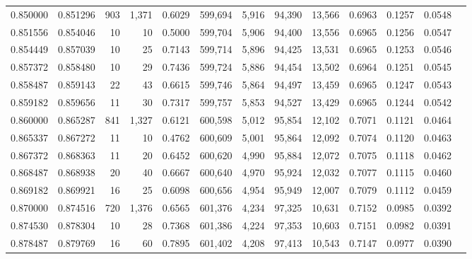 \begin{tabular}{rrrrrrrrrrrrr}
0.850000 & 0.851296 &    903 & 1,371 &                                     0.6029 & 599,694 &   5,916 &  94,390 &  13,566 & 0.6963 & 0.1257 & 0.0548 \\
0.851556 & 0.854046 &     10 &    10 &                                     0.5000 & 599,704 &   5,906 &  94,400 &  13,556 & 0.6965 & 0.1256 & 0.0547 \\
0.854449 & 0.857039 &     10 &    25 &                                     0.7143 & 599,714 &   5,896 &  94,425 &  13,531 & 0.6965 & 0.1253 & 0.0546 \\
0.857372 & 0.858480 &     10 &    29 &                                     0.7436 & 599,724 &   5,886 &  94,454 &  13,502 & 0.6964 & 0.1251 & 0.0545 \\
0.858487 & 0.859143 &     22 &    43 &                                     0.6615 & 599,746 &   5,864 &  94,497 &  13,459 & 0.6965 & 0.1247 & 0.0543 \\
0.859182 & 0.859656 &     11 &    30 &                                     0.7317 & 599,757 &   5,853 &  94,527 &  13,429 & 0.6965 & 0.1244 & 0.0542 \\
0.860000 & 0.865287 &    841 & 1,327 &                                     0.6121 & 600,598 &   5,012 &  95,854 &  12,102 & 0.7071 & 0.1121 & 0.0464 \\
0.865337 & 0.867272 &     11 &    10 &                                     0.4762 & 600,609 &   5,001 &  95,864 &  12,092 & 0.7074 & 0.1120 & 0.0463 \\
0.867372 & 0.868363 &     11 &    20 &                                     0.6452 & 600,620 &   4,990 &  95,884 &  12,072 & 0.7075 & 0.1118 & 0.0462 \\
0.868487 & 0.868938 &     20 &    40 &                                     0.6667 & 600,640 &   4,970 &  95,924 &  12,032 & 0.7077 & 0.1115 & 0.0460 \\
0.869182 & 0.869921 &     16 &    25 &                                     0.6098 & 600,656 &   4,954 &  95,949 &  12,007 & 0.7079 & 0.1112 & 0.0459 \\
0.870000 & 0.874516 &    720 & 1,376 &                                     0.6565 & 601,376 &   4,234 &  97,325 &  10,631 & 0.7152 & 0.0985 & 0.0392 \\
0.874530 & 0.878304 &     10 &    28 &                                     0.7368 & 601,386 &   4,224 &  97,353 &  10,603 & 0.7151 & 0.0982 & 0.0391 \\
0.878487 & 0.879769 &     16 &    60 &                                     0.7895 & 601,402 &   4,208 &  97,413 &  10,543 & 0.7147 & 0.0977 & 0.0390 \\

\end{tabular}
